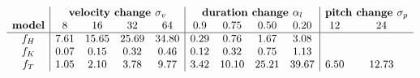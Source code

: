 $$\begin{array}{c|cccc|cccc|cc}
 & \multicolumn{4}{c|}{\textbf{velocity change }\sigma_v} & \multicolumn{4}{c|}{\textbf{duration change }\alpha_l} & \multicolumn{2}{c}{\textbf{pitch change }\sigma_p}\\
\textbf{model} & 8 & 16 & 32 & 64 & 0.9 & 0.75 & 0.50 & 0.20 & 12 & 24 \\ \hline
f_H & 7.61 & 15.65 & 25.69 & 34.80 & 0.29 & 0.76 & 1.67 & 3.08 & \multicolumn{2}{c}{} \\
f_K & 0.07 & 0.15 & 0.32 & 0.46 & 0.12 & 0.32 & 0.75 & 1.13 & \multicolumn{2}{c}{} \\
f_T & 1.05 & 2.10 & 3.78 & 9.77 & 3.42 & 10.10 & 25.21 & 39.67 & 6.50 & 12.73
\end{array}$$